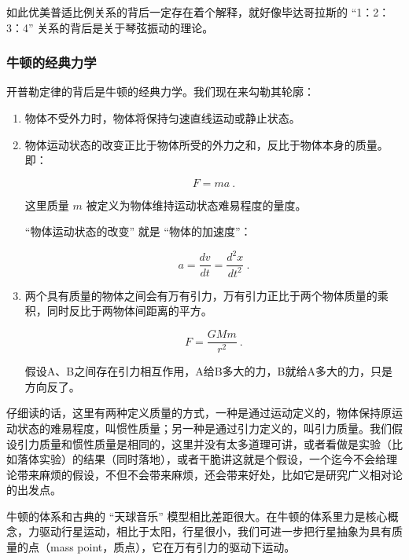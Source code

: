 如此优美普适比例关系的背后一定存在着个解释，就好像毕达哥拉斯的 “1：2：3：4” 关系的背后是关于琴弦振动的理论。

\subsubsection{牛顿的经典力学}

开普勒定律的背后是牛顿的经典力学。我们现在来勾勒其轮廓：

\begin{enumerate}
\item 

物体不受外力时，物体将保持匀速直线运动或静止状态。

\item

物体运动状态的改变正比于物体所受的外力之和，反比于物体本身的质量。即：

\begin{equation}
F = ma~.
\end{equation}

这里质量 $m$ 被定义为物体维持运动状态难易程度的量度。

“物体运动状态的改变” 就是 “物体的加速度”：

\begin{equation}
a = \frac{d v}{d t} = \frac{d^2 x}{d t^2}~.
\end{equation}

\item

两个具有质量的物体之间会有万有引力，万有引力正比于两个物体质量的乘积，同时反比于两物体间距离的平方。

\begin{equation}
F = \frac{G M m}{r^2}~.
\end{equation}

假设A、B之间存在引力相互作用，A给B多大的力，B就给A多大的力，只是方向反了。

\end{enumerate}

仔细读的话，这里有两种定义质量的方式，一种是通过运动定义的，物体保持原运动状态的难易程度，叫惯性质量；另一种是通过引力定义的，叫引力质量。我们假设引力质量和惯性质量是相同的，这里并没有太多道理可讲，或者看做是实验（比如落体实验）的结果（同时落地），或者干脆讲这就是个假设，一个迄今不会给理论带来麻烦的假设，不但不会带来麻烦，还会带来好处，比如它是研究广义相对论的出发点。

牛顿的体系和古典的 “天球音乐” 模型相比差距很大。在牛顿的体系里力是核心概念，力驱动行星运动，相比于太阳，行星很小，我们可进一步把行星抽象为具有质量的点（mass point，质点），它在万有引力的驱动下运动。

